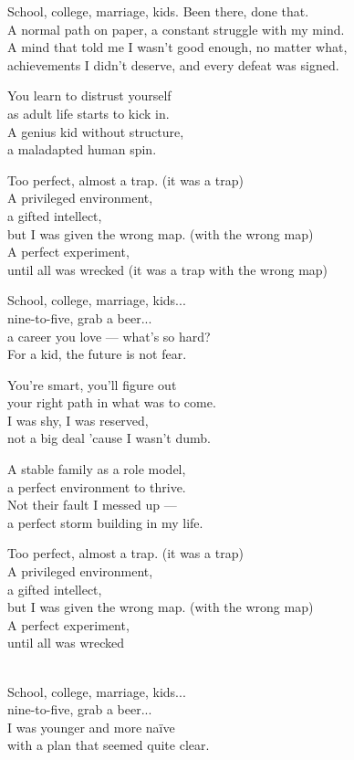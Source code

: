 \begin{lyrics}
School, college, marriage, kids. Been there, done that.\\
A normal path on paper, a constant struggle with my mind.\\
A mind that told me I wasn't good enough, no matter what,\\
achievements I didn't deserve, and every defeat was signed.

You learn to distrust yourself\\
as adult life starts to kick in.\\
A genius kid without structure,\\
a maladapted human spin.

Too perfect, almost a trap. (it was a trap)\\
A privileged environment,\\
a gifted intellect,\\
but I was given the wrong map. (with the wrong map)\\
A perfect experiment,\\
until all was wrecked
(it was a trap with the wrong map)

School, college, marriage, kids...\\
nine-to-five, grab a beer...\\
a career you love — what's so hard?\\
For a kid, the future is not fear.

You're smart, you'll figure out\\
your right path in what was to come.\\
I was shy, I was reserved,\\
not a big deal 'cause I wasn't dumb.

A stable family as a role model,\\
a perfect environment to thrive.
\\
Not their fault I messed up —\\
a perfect storm building in my life.

Too perfect, almost a trap. (it was a trap)\\
A privileged environment,\\
a gifted intellect,\\
but I was given the wrong map. (with the wrong map)\\
A perfect experiment,\\
until all was wrecked

\\
School, college, marriage, kids...\\
nine-to-five, grab a beer...\\
I was younger and more naïve\\
with a plan that seemed quite clear.

\end{lyrics}

